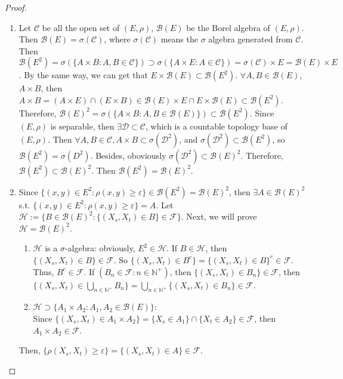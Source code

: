\documentclass{ctexart}
\begin{document}
\begin{proof}
  \begin{enumerate}
    \item Let \(\mathscr{C}\) be all the open set of \((E,\rho)\), \(\mathscr{B}(E)\) be the Borel algebra
      of \((E,\rho)\). Then \(\mathscr{B}(E) = \sigma(\mathscr{C})\), where \(\sigma(\mathscr{C})\)
      means the \(\sigma\) algebra generated from \(\mathscr{C}\).
      Then \(\mathscr{B}(E^2)= \sigma(\{A \times B: A, B \in \mathscr{C}\}) \supset \sigma(\{A \times E :A \in \mathscr{C}\}) = \sigma(\mathscr{C})\times E=\mathscr{B}(E) \times E\).
      By the same way, we can get that \(E \times \mathscr{B}(E) \subset \mathscr{B}(E^2)\).
      \(\forall A,B \in \mathscr{B}(E)\), \(A \times B\), then \( A \times B= (A \times E) \cap (E \times B) \in \mathscr{B}(E) \times E \cap E \times \mathscr{B}(E) \subset \mathscr{B}(E^2)\).
      Therefore, \(\mathscr{B}(E)^2 = \sigma(\{A \times B: A, B \in \mathscr{B}(E)\}) \subset \mathscr{B}(E^2)\).
      Since \((E,\rho)\) is separable, then \(\exists \mathscr{D} \subset \mathscr{C}\), which
      is a countable topology base of \((E,\rho)\).
      Then \(\forall A,B \in \mathscr{C}, A \times B \subset \sigma(\mathscr{D}^2)\),
      and \(\sigma(\mathscr{D}^2) \subset \mathscr{B}(E^2)\),
      so \(\mathscr{B}(E^2)= \sigma(D^2)\).
      Besides, oboviously \(\sigma(\mathscr{D}^2) \subset \mathscr{B}(E)^2\).
      Therefore, \(\mathscr{B}(E^2) \subset \mathscr{B}(E)^2\).
      Then \(\mathscr{B}(E^2) = \mathscr{B}(E)^2\).
    \item Since \(\{(x,y) \in E^2: \rho(x,y) \geq \varepsilon\} \in \mathscr{B}(E^2) = \mathscr{B}(E)^2\),
      then \(\exists A \in \mathscr{B}(E)^2\) s.t.
      \(\{(x,y) \in E^2: \rho(x,y) \geq \varepsilon\} = A\).
      Let \(\mathscr{H}:= \{B \in \mathscr{B}(E)^2: \{(X_s,X_t) \in B\} \in \mathscr{F}\}\).
      Next, we will prove \(\mathscr{H} = \mathscr{B}(E)^2\).
      \begin{enumerate}
        \item \(\mathscr{H}\) is a \(\sigma\)-algebra: obviously, \(E^2 \in \mathscr{H}\).
          If \(B \in \mathscr{H}\), then \(\{(X_s,X_t) \in B \} \in \mathscr{F}\).
          So \(\{(X_s,X_t) \in B^c\} = \{(X_s,X_t) \in B\}^c \in \mathscr{F}\).
          Thus, \(B^c \in \mathscr{F}\).
          If \((B_n \in \mathscr{F}: n \in \mathbb{N}^{+})\), then \(\{(X_s,X_t) \in B_n\} \in \mathscr{F}\),
          then \(\{(X_s,X_t) \in \bigcup_{n \in \mathbb{N}^{+}} B_n\} = \bigcup_{n \in \mathbb{N}^{+}} \{(X_s,X_t) \in B_n\} \in \mathscr{F}\).
        \item \(\mathscr{H} \supset \{A_1 \times A_2: A_1, A_2 \in \mathscr{B}(E)\}\):\\
          Since \(\{(X_s,X_t) \in A_1 \times A_2\} = \{X_s \in A_1\} \cap \{X_t \in A_2\} \in \mathscr{F}\),
          then \(A_1 \times A_2 \in \mathscr{F}\).
      \end{enumerate}

      Then, \(\{\rho(X_s,X_t) \geq \varepsilon\} = \{(X_s,X_t) \in A\} \in \mathscr{F}\).

  \end{enumerate}
\end{proof}
\end{document}
